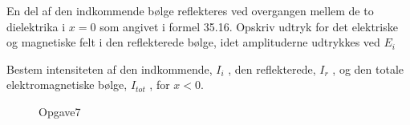 \begin{subexercise}[iii]
En del af den indkommende bølge reflekteres ved overgangen mellem de to dielektrika i $x=0$ som angivet i formel 35.16. Opskriv udtryk for det elektriske og magnetiske felt i den reflekterede bølge, idet amplituderne udtrykkes ved $E_i$
\end{subexercise}
\begin{solution}

\end{solution}
\begin{subexercise}[iv]
Bestem intensiteten af den indkommende, $I_i$ , den reflekterede, $I_r$ , og den totale elektromagnetiske bølge, $I_{tot}$ , for $x<0$.
\end{subexercise}
\begin{solution}

\end{solution}
\begin{exercise}[Opgave 7.]

\end{exercise}
\begin{figure}[ht]
    \centering
    \caption{Opgave7}
    \label{fig:opgave7}
\end{figure}

